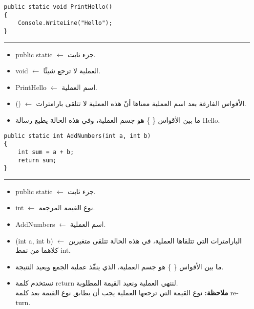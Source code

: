 \documentclass[12pt]{article}
\begin{document}
\begin{boxExample}[1]
\begin{english}
\begin{verbatim}
public static void PrintHello()
{
    Console.WriteLine("Hello");
}
\end{verbatim}
\end{english}
\hrule
\begin{itemize}
    \item \textenglish{public static} $\leftarrow$ جزء ثابت.
    \item \textenglish{void} $\leftarrow$ العملية لا ترجع شيئًا.
    \item \textenglish{PrintHello} $\leftarrow$ اسم العملية.
    \item \textenglish{()} $\leftarrow$ الأقواس الفارغة بعد اسم العملية معناها أنّ هذه العملية لا تتلقى بارامترات.
    \item ما بين الأقواس \textenglish{\{ \}} هو جسم العملية، وفي هذه الحالة يطبع رسالة \textenglish{Hello}.
\end{itemize}
\end{boxExample}

\begin{boxExample}[2]
\begin{english}
\begin{verbatim}
public static int AddNumbers(int a, int b)
{
    int sum = a + b;
    return sum;
}
\end{verbatim}
\end{english}
\hrule
\begin{itemize}
    \item \textenglish{public static} $\leftarrow$ جزء ثابت.
    \item \textenglish{int} $\leftarrow$ نوع القيمة المرجعة.
    \item \textenglish{AddNumbers} $\leftarrow$ اسم العملية.
    \item \textenglish{(int a, int b)} $\leftarrow$ البارامترات التي تتلقاها العملية، في هذه الحالة تتلقى متغيرين كلاهما من نمط \textenglish{int}.
    \item ما بين الأقواس \textenglish{\{ \}} هو جسم العملية، الذي ينفّذ عملية الجمع ويعيد النتيجة.
    \item نستخدم كلمة \textenglish{return} لننهي العملية ونعيد القيمة المطلوبة. \\
    \textbf{ملاحظة:} نوع القيمة التي ترجعها العملية يجب أن يطابق نوع القيمة بعد كلمة \textenglish{return}.
\end{itemize}
\end{boxExample}
\end{document}

